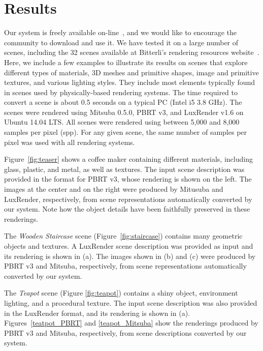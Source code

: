 \section{Results}
\label{sec:results}

Our system is freely available on-line~\cite{sceneConverter}, and we would like to encourage the community to download and use it.
We have tested it on a large number of scenes, including the 32 scenes available
at Bitterli's rendering resources website~\cite{resources16}. 
Here, we include a few examples to illustrate its results on scenes that explore different 
types of materials, 3D meshes and primitive shapes, image and 
primitive textures, and various lighting styles. They include most elements typically found in scenes used by physically-based rendering systems.  The time required to convert a scene is about 0.5 seconds on a typical PC (Intel i5 3.8 GHz).
% 
%
The scenes were rendered using Mitsuba 0.5.0, PBRT v3, and LuxRender v1.6 on 
Ubuntu 14.04 LTS. All scenes were rendered using between 5,000 and 8,000 samples per pixel (spp). For any given scene,
the same number of samples per pixel was used with all rendering systems. 

Figure~\ref{fig:teaser} shows a coffee maker containing different materials, including glass, plastic, and metal, as well as textures. The input scene description was provided in the format for PBRT v3, whose rendering is shown on the left. The images at the center and on the right were produced by Mitusuba and LuxRender, respectively, from scene representations automatically converted by our system. 
Note how the object details have been faithfully preserved in these renderings.

The \textit{Wooden Staircase} scene (Figure~\ref{fig:staircase}) contains many geometric objects and textures. 
A LuxRender scene description was provided as input and its rendering is shown in (a). The images shown in (b) and (c) were produced 
by PBRT v3 and Mitsuba, respectively, from scene representations automatically converted by our system. 

The \textit{Teapot} scene (Figure \ref{fig:teapot}) contains a shiny object, environment lighting, and a procedural texture. The input scene description was also provided in the LuxRender format, and its rendering is shown in (a). Figures~\ref{teatpot_PBRT} and \ref{teapot_Mitsuba} show the renderings produced by PBRT v3 and Mitsuba, respectively, from scene descriptions converted by our system.

